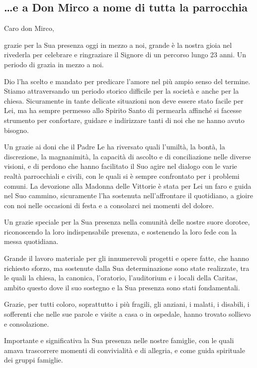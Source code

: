 \subsection{\dots e a Don Mirco a nome di tutta la parrocchia}

Caro don Mirco,

grazie per la Sua presenza oggi in mezzo a noi, grande è la nostra gioia nel rivederla per celebrare e ringraziare il Signore di un percorso lungo 23 anni. Un periodo di grazia in mezzo a noi.

Dio l'ha scelto e mandato per predicare l'amore nel più ampio senso del termine. Stiamo attraversando un periodo storico difficile per la società e anche per la chiesa. Sicuramente in tante delicate situazioni non deve essere stato facile per Lei, ma ha sempre permesso allo Spirito Santo di permearla affinché si facesse strumento per confortare, guidare e indirizzare tanti di noi che ne hanno avuto bisogno.

Un grazie ai doni che il Padre Le ha riversato quali l'umiltà, la bontà, la discrezione, la magnanimità, la capacità di ascolto e di conciliazione nelle diverse visioni, e di perdono che hanno facilitato il Suo agire nel dialogo con le varie realtà parrocchiali e civili, con le quali si è sempre confrontato per i problemi comuni. La devozione alla Madonna delle Vittorie è stata per Lei un faro e guida nel Suo cammino, sicuramente l'ha sostenuta nell'affrontare il quotidiano, a gioire con noi nelle occasioni di festa e a consolarci nei momenti del dolore.

Un grazie speciale per la Sua presenza nella comunità delle nostre suore dorotee, riconoscendo la loro indispensabile presenza, e sostenendo la loro fede con la messa quotidiana.

Grande il lavoro materiale per gli innumerevoli progetti e opere fatte, che hanno richiesto sforzo, ma sostenute dalla Sua determinazione sono state realizzate, tra le quali la chiesa, la canonica, l'oratorio, l'auditorium e i locali della Caritas, ambito questo dove il suo sostegno e la Sua presenza sono stati fondamentali.

Grazie, per tutti coloro, soprattutto i più fragili, gli anziani, i malati, i disabili, i sofferenti che nelle sue parole e visite a casa o in ospedale, hanno trovato sollievo e consolazione.

Importante e significativa la Sua presenza nelle nostre famiglie, con le quali amava trascorrere momenti di convivialità e di allegria, e come guida spirituale dei gruppi famiglie.


